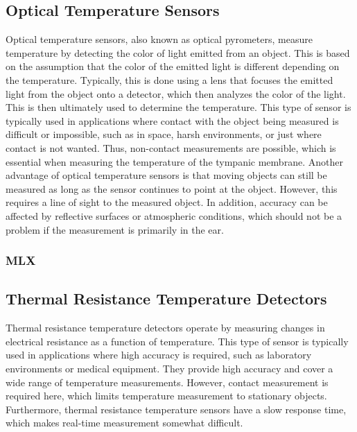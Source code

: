 \subsection{Optical Temperature Sensors}
\label{Background:TemperatureSensors:OpticalTS}
Optical temperature sensors, also known as optical pyrometers, measure temperature by detecting the color of light emitted from an object. 
This is based on the assumption that the color of the emitted light is different depending on the temperature.
Typically, this is done using a lens that focuses the emitted light from the object onto a detector, which then analyzes the color of the light. 
This is then ultimately used to determine the temperature.
This type of sensor is typically used in applications where contact with the object being measured is difficult or impossible, such as in space, harsh environments, or just where contact is not wanted.
Thus, non-contact measurements are possible, which is essential when measuring the temperature of the tympanic membrane.
Another advantage of optical temperature sensors is that moving objects can still be measured as long as the sensor continues to point at the object.
However, this requires a line of sight to the measured object.
In addition, accuracy can be affected by reflective surfaces or atmospheric conditions, which should not be a problem if the measurement is primarily in the ear.

\subsubsection{MLX}
\label{Background:TemperatureSensors:OpticalTS:MLX}

\subsection{Thermal Resistance Temperature Detectors}
\label{Background:TemperatureSensors:ResistanceTD}
Thermal resistance temperature detectors operate by measuring changes in electrical resistance as a function of temperature. 
This type of sensor is typically used in applications where high accuracy is required, such as laboratory environments or medical equipment.
They provide high accuracy and cover a wide range of temperature measurements.
However, contact measurement is required here, which limits temperature measurement to stationary objects.
Furthermore, thermal resistance temperature sensors have a slow response time, which makes real-time measurement somewhat difficult.

